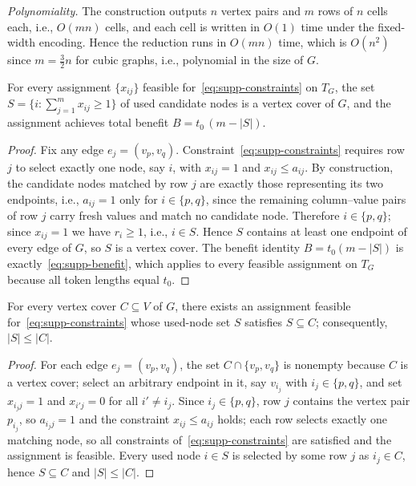 \emph{Polynomiality.}
The construction outputs $n$ vertex pairs and $m$ rows of $n$ cells each, i.e., $O(mn)$ cells, and each cell is written in $O(1)$ time under the fixed-width encoding. Hence the reduction runs in $O(mn)$ time, which is $O(n^2)$ since $m=\tfrac{3}{2}n$ for cubic graphs, i.e., polynomial in the size of $G$.

\begin{lemma}
\label{lem:cover}
For every assignment $\{x_{ij}\}$ feasible for~\eqref{eq:supp-constraints} on $T_G$, the set $S=\{i:\sum_{j=1}^{m}x_{ij}\geq 1\}$ of used candidate nodes is a vertex cover of $G$, and the assignment achieves total benefit $B=t_0\,(m-|S|)$.
\end{lemma}

\begin{proof}
Fix any edge $e_j=(v_p,v_q)$. Constraint~\eqref{eq:supp-constraints} requires row $j$ to select exactly one node, say $i$, with $x_{ij}=1$ and $x_{ij}\leq a_{ij}$. By construction, the candidate nodes matched by row $j$ are exactly those representing its two endpoints, i.e., $a_{ij}=1$ only for $i\in\{p,q\}$, since the remaining column--value pairs of row $j$ carry fresh values and match no candidate node. Therefore $i\in\{p,q\}$; since $x_{ij}=1$ we have $r_i\geq 1$, i.e., $i\in S$. Hence $S$ contains at least one endpoint of every edge of $G$, so $S$ is a vertex cover. The benefit identity $B=t_0(m-|S|)$ is exactly~\eqref{eq:supp-benefit}, which applies to every feasible assignment on $T_G$ because all token lengths equal $t_0$.
\end{proof}

\begin{lemma}
\label{lem:assign}
For every vertex cover $C\subseteq V$ of $G$, there exists an assignment feasible for~\eqref{eq:supp-constraints} whose used-node set $S$ satisfies $S\subseteq C$; consequently, $|S|\leq|C|$.
\end{lemma}

\begin{proof}
For each edge $e_j=(v_p,v_q)$, the set $C\cap\{v_p,v_q\}$ is nonempty because $C$ is a vertex cover; select an arbitrary endpoint in it, say $v_{i_j}$ with $i_j\in\{p,q\}$, and set $x_{i_j j}=1$ and $x_{i'j}=0$ for all $i'\neq i_j$. Since $i_j\in\{p,q\}$, row $j$ contains the vertex pair $p_{i_j}$, so $a_{i_j j}=1$ and the constraint $x_{ij}\leq a_{ij}$ holds; each row selects exactly one matching node, so all constraints of~\eqref{eq:supp-constraints} are satisfied and the assignment is feasible. Every used node $i\in S$ is selected by some row $j$ as $i_j\in C$, hence $S\subseteq C$ and $|S|\leq|C|$.
\end{proof}

